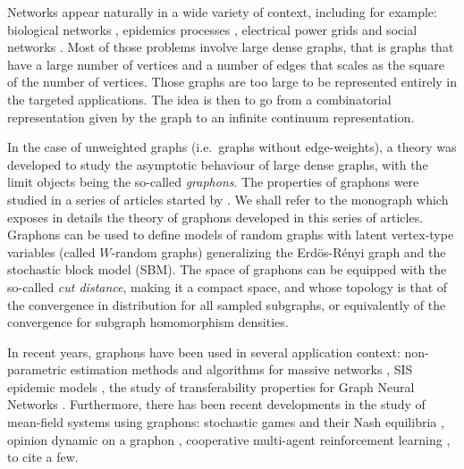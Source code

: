 \documentclass{amsart}
\newcommand{\ie}{i.e.\ }
\theoremstyle{plain}
\theoremstyle{definition}
\begin{document}
Networks appear  naturally in a  wide variety of context,  including for
example: biological  networks \cite{bornholdtHandbookGraphsNetworks2002,
lewisNetworkScienceTheory2009},         epidemics        processes
\cite{draiefEpidemicsRumoursComplex2010,
  kissMathematicsEpidemicsNetworks2017},   electrical  power   grids 
\cite{albertStructuralVulnerabilityNorth2004}   and    social   networks
\cite{albertStatisticalMechanicsComplex2002, newmanStructureFunctionComplex2003}.
Most of those problems involve large dense graphs,
	that is graphs that have a large number of vertices
	and a number of edges that scales as the square of the number of vertices.
Those graphs are too large to be represented entirely in the targeted applications.
The idea is then to go from a combinatorial representation given by the graph
to an infinite continuum representation. 


In the case of unweighted graphs (\ie graphs without edge-weights), 
	a theory was developed to study the asymptotic behaviour
	of large dense graphs, 
	with the limit objects being the so-called \emph{graphons}.
The properties of graphons were studied in a series of articles started by
	\cite{lovaszLimitsDenseGraph2006, 
freedmanReflectionPositivityRank2006, 
bollobasCutMetricRandom2010, 
borgsConvergentSequencesDense2008,borgsConvergentSequencesDense2012}.
We shall refer to the monograph \cite{Lovasz} which exposes in details
	the theory of graphons developed in this series of articles.
Graphons can be used to define models of random graphs 
	with latent vertex-type variables
	(called $W$-random graphs)
	generalizing the Erdös-Rényi graph and the stochastic block model (SBM).
The space of graphons can be equipped with the so-called \emph{cut distance},
	making it a compact space, and whose topology is that of 
	the convergence in distribution for all sampled subgraphs,
	or equivalently of the convergence for subgraph homomorphism densities.

In recent years, graphons have been used in several application context: 
	non-parametric estimation methods and algorithms for massive networks \cite{borgsGraphonsNonparametricMethod2017},
	SIS epidemic models \cite{delmasInfinitedimensionalMetapopulationSIS2022},
	the study of transferability properties for Graph Neural Networks \cite{kerivenWhatFunctionsCan2023}. 
Furthermore, there has been recent developments in the study of mean-field systems using graphons:
	stochastic games and their Nash equilibria \cite{lackerLabelstateFormulationStochastic2022},
	opinion dynamic on a graphon \cite{alettiOpinionDynamicsGraphon2022},
	cooperative multi-agent reinforcement learning \cite{huGraphonMeanfieldControl2023}, to cite a few.
\medskip
\end{document}
